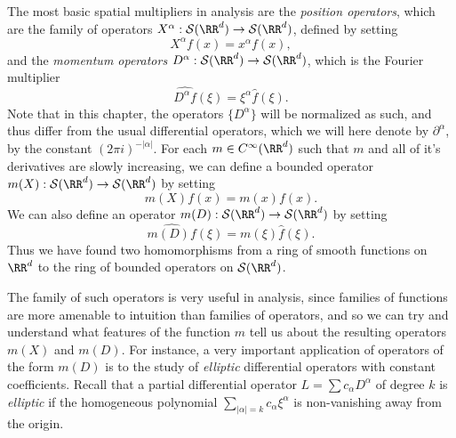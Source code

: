 The most basic spatial multipliers in analysis are the \emph{position operators}, which are the family of operators $X^\alpha: \mathcal{S}(\RR^d) \to \mathcal{S}(\RR^d)$, defined by setting
%
\[ X^\alpha f(x) = x^\alpha f(x), \]
%
and the \emph{momentum operators} $D^\alpha: \mathcal{S}(\RR^d) \to \mathcal{S}(\RR^d)$, which is the Fourier multiplier
%
\[ \widehat{D^\alpha f}(\xi) = \xi^\alpha \widehat{f}(\xi). \]
%
Note that in this chapter, the operators $\{ D^\alpha \}$ will be normalized as such, and thus differ from the usual differential operators, which we will here denote by $\partial^\alpha$, by the constant $(2 \pi i)^{-|\alpha|}$. For each $m \in C^\infty(\RR^d)$ such that $m$ and all of it's derivatives are slowly increasing, we can define a bounded operator $m(X): \mathcal{S}(\RR^d) \to \mathcal{S}(\RR^d)$ by setting
%
\[ m(X) f(x) = m(x) f(x). \]
%
We can also define an operator $m(D): \mathcal{S}(\RR^d) \to \mathcal{S}(\RR^d)$ by setting
%
\[ \widehat{m(D) f}(\xi) = m(\xi) \widehat{f}(\xi). \]
%
Thus we have found two homomorphisms from a ring of smooth functions on $\RR^d$ to the ring of bounded operators on $\mathcal{S}(\RR^d)$.

The family of such operators is very useful in analysis, since families of functions are more amenable to intuition than families of operators, and so we can try and understand what features of the function $m$ tell us about the resulting operators $m(X)$ and $m(D)$. For instance, a very important application of operators of the form $m(D)$ is to the study of \emph{elliptic} differential operators with constant coefficients. Recall that a partial differential operator $L = \sum c_\alpha D^\alpha$ of degree $k$ is \emph{elliptic} if the homogeneous polynomial $\sum_{|\alpha| = k} c_\alpha \xi^\alpha$ is non-vanishing away from the origin.

